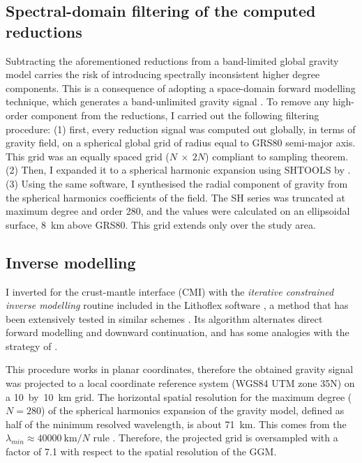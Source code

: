 \subsection{Spectral-domain filtering of the computed reductions}
\label{ss:Appl:GravSpectralFiltering}
Subtracting the aforementioned reductions from a band-limited global gravity model carries the risk of introducing spectrally inconsistent higher degree components.
This is a consequence of adopting a space-domain forward modelling technique, which generates a band-unlimited gravity signal \parencite{Hirt2014}.
To remove any high-order component from the reductions, I carried out the following filtering procedure:
(1) first, every reduction signal was computed out globally, in terms of gravity field, on a spherical global grid of radius equal to {GRS80} semi-major axis.
This grid was an equally spaced grid ($N~\times~2N$) compliant to \textcite{Driscoll1994} sampling theorem.
(2) Then, I expanded it to a spherical harmonic expansion using {SHTOOLS} by \textcite{Wieczorek2018}. \nocite{SHTOOLS43Wieczorek2018}
(3) Using the same software, I synthesised the radial component of gravity from the spherical harmonics coefficients of the field. The SH series was truncated at maximum degree and order 280, and the values were calculated on an ellipsoidal surface, 8~\si{\kilo \metre} above GRS80.
This grid extends only over the study area.

\subsection{Inverse modelling}
\label{ss:Appl:GravInv}
I inverted for the crust-mantle interface (CMI) with the \textit{iterative constrained inverse modelling} routine included in the Lithoflex software \parencite{Braitenberg2007}, a method that has been extensively tested in similar schemes \parencites{Ebbing2001}{Mariani2013}.
Its algorithm alternates direct forward modelling and downward continuation, and has some analogies with the strategy of \textcite{Oldenburg1974}.

This procedure works in planar coordinates, therefore the obtained gravity signal was projected to a local coordinate reference system (WGS84 UTM zone 35N) on a 10~by~10~{km} grid.
The horizontal spatial resolution for the maximum degree ($N=280$) of the spherical harmonics expansion of the gravity model, defined as half of the minimum resolved wavelength, is about 71~\si{\kilo \metre}. This comes from the $\lambda_{min} \approx 40000~\textrm{km} / N $ rule \parencite{HofmannWellenhof2006}.
Therefore, the projected grid is oversampled with a factor of 7.1 with respect to the spatial resolution of the GGM.

